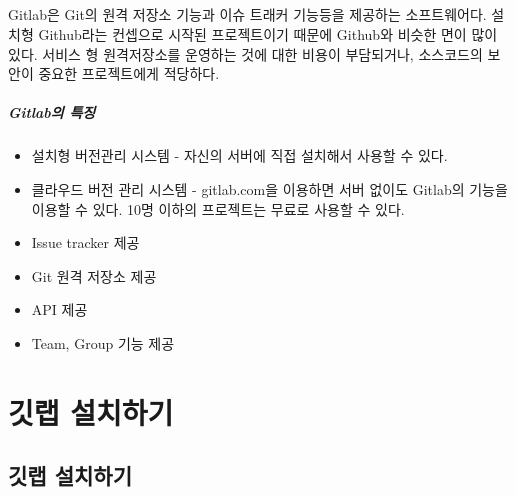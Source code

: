 \documentclass[12pt, a4paper, oneside]{book}
\let\stdsection\section
\renewcommand\section{\newpage\stdsection}
\begin{document}
	\paragraph{}
Gitlab은 Git의 원격 저장소 기능과 이슈 트래커 기능등을 제공하는 소프트웨어다. 설치형 Github라는 컨셉으로 시작된 프로젝트이기 때문에 Github와 비슷한 면이 많이 있다. 서비스 형 원격저장소를 운영하는 것에 대한 비용이 부담되거나, 소스코드의 보안이 중요한 프로젝트에게 적당하다. 


							

	\paragraph{Gitlab의 특징}


			\begin{itemize}
			\item 	설치형 버전관리 시스템 - 자신의 서버에 직접 설치해서 사용할 수 있다. 
			\item 	클라우드 버전 관리 시스템 - gitlab.com을 이용하면 서버 없이도 Gitlab의 기능을 이용할 수 있다. 10명 이하의 프로젝트는 무료로 사용할 수 있다. 
			\item 	Issue tracker 제공
			\item 	Git 원격 저장소 제공
			\item 	API 제공 
			\item 	Team, Group 기능 제공
			\end{itemize}






%	
	\chapter 	{깃랩 설치하기}



%	
	\section 	{깃랩 설치하기}


%	
\end{document}
